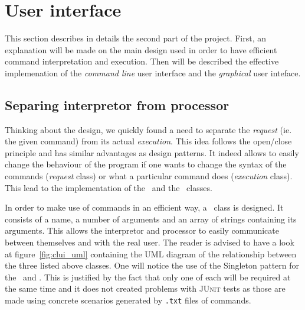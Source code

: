 \section{User interface} %
\label{sec:user_interface}
This section describes in details the second part of the project.
First, an explanation will be made on the main design used in order
to have efficient command interpretation and execution.
Then will be described the effective implemenation
of the \emph{command line} user interface and the \emph{graphical} user inteface.

\subsection{Separing interpretor from processor} %
\label{sub:separing_command_getter_and_command_processor}

Thinking about the design, we quickly found a need to separate
the \emph{request} (ie. the given command) from its actual \emph{execution}.
This idea follows the open/close principle and has similar advantages
as design patterns.
It indeed allows to easily change the behaviour of the program if
one wants to change the syntax of the commands (\emph{request} class)
or what a particular command does (\emph{execution} class).
This lead to the implementation of the \CommandLine~and
the \CommandProcessor~classes.

In order to make use of commands in an efficient way,
a \Command~class is designed.
It consists of a name, a number of arguments and an array
of strings containing its arguments.
This allows the interpretor and processor to easily
communicate between themselves and with the real user.
The reader is advised to have a look at figure~\ref{fig:clui_uml}
containing the UML diagram of the relationship between
the three listed above classes.
One will notice the use of the Singleton pattern for
the \CommandProcessor~and \CommandLine.
This is justified by the fact that only one
of each will be required at the same time
and it does not created problems with \textsc{JUnit} tests
as those are made using concrete scenarios
generated by \texttt{.txt} files of commands.

